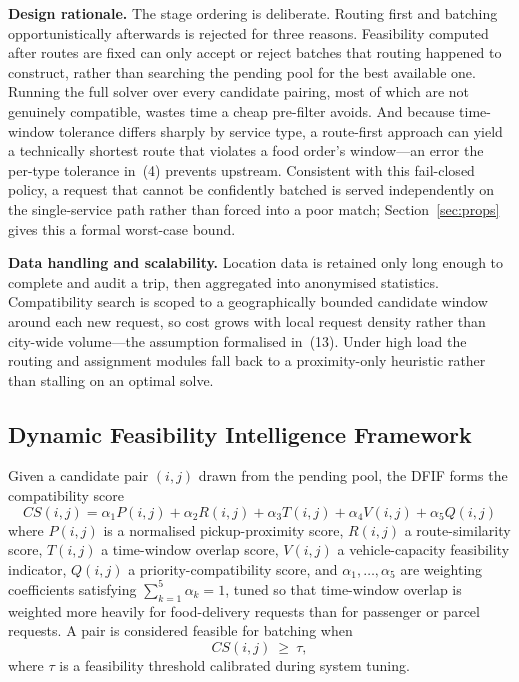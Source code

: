\documentclass[conference]{IEEEtran}
\begin{document}
\textbf{Design rationale.} The stage ordering is deliberate. Routing first
and batching opportunistically afterwards is rejected for three reasons.
Feasibility computed after routes are fixed can only accept or reject batches
that routing happened to construct, rather than searching the pending pool for
the best available one. Running the full solver over every candidate pairing,
most of which are not genuinely compatible, wastes time a cheap pre-filter
avoids. And because time-window tolerance differs sharply by service type, a
route-first approach can yield a technically shortest route that violates a
food order's window---an error the per-type tolerance in~(4) prevents
upstream. Consistent with this fail-closed policy, a request that cannot be
confidently batched is served independently on the single-service path rather
than forced into a poor match; Section~\ref{sec:props} gives this a formal
worst-case bound.

\textbf{Data handling and scalability.} Location data is retained only long
enough to complete and audit a trip, then aggregated into anonymised
statistics. Compatibility search is scoped to a geographically bounded
candidate window around each new request, so cost grows with local request
density rather than city-wide volume---the assumption formalised in~(13).
Under high load the routing and assignment modules fall back to a
proximity-only heuristic rather than stalling on an optimal solve.

\subsection{Dynamic Feasibility Intelligence Framework}
\label{sec:score}
Given a candidate pair $(i,j)$ drawn from the pending pool, the DFIF forms
the compatibility score
\begin{equation}
CS(i,j)=\alpha_1 P(i,j)+\alpha_2 R(i,j)+\alpha_3 T(i,j)
        +\alpha_4 V(i,j)+\alpha_5 Q(i,j)
\end{equation}
where $P(i,j)$ is a normalised pickup-proximity score, $R(i,j)$ a
route-similarity score, $T(i,j)$ a time-window overlap score, $V(i,j)$ a
vehicle-capacity feasibility indicator, $Q(i,j)$ a priority-compatibility
score, and $\alpha_1,\dots,\alpha_5$ are weighting coefficients satisfying
$\sum_{k=1}^{5}\alpha_k=1$, tuned so that time-window overlap is weighted
more heavily for food-delivery requests than for passenger or parcel requests.
A pair is considered feasible for batching when
\begin{equation}
CS(i,j)\ \ge\ \tau,
\end{equation}
where $\tau$ is a feasibility threshold calibrated during system tuning.
\end{document}
